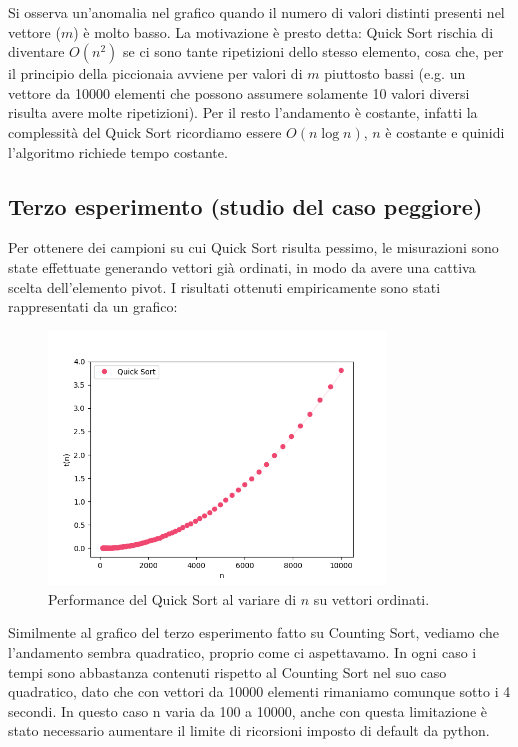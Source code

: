 \documentclass[a4paper, 12pt, oneside]{book}
\begin{document}
\noindent Si osserva un'anomalia nel grafico quando il numero di valori distinti presenti nel vettore (\(m\)) è molto basso. La motivazione è presto detta: Quick Sort rischia di diventare $O(n^2)$ se ci sono tante ripetizioni dello stesso elemento, cosa che, per il principio della piccionaia avviene per valori di $m$ piuttosto bassi (e.g. un vettore da 10000 elementi che possono assumere solamente 10 valori diversi risulta avere molte ripetizioni). Per il resto l'andamento è costante, infatti la complessità del Quick Sort ricordiamo essere $O(n \log n)$, $n$ è costante e quinidi l'algoritmo richiede tempo costante.

\subsection{Terzo esperimento (studio del caso peggiore)}

Per ottenere dei campioni su cui Quick Sort risulta pessimo, le misurazioni sono state effettuate generando vettori già ordinati, in modo da avere una cattiva scelta dell'elemento pivot. I risultati ottenuti empiricamente sono stati rappresentati da un grafico: 

\begin{figure}[H]
    \centering
    \includegraphics[width=0.8\textwidth]{images/quickSortCasoPeggiore.png}
    \caption{Performance del Quick Sort al variare di \(n\) su vettori ordinati.}
    \label{fig:quick_sort_n}
\end{figure}

\noindent Similmente al grafico del terzo esperimento fatto su Counting Sort, vediamo che l'andamento sembra quadratico, proprio come ci aspettavamo. 
 In ogni caso i tempi sono abbastanza contenuti rispetto al Counting Sort nel suo caso quadratico, dato che con vettori da 10000 elementi rimaniamo comunque sotto i 4 secondi. In questo caso n varia da 100 a 10000, anche con questa limitazione è stato necessario aumentare il limite di ricorsioni imposto di default da python.
\end{document}
